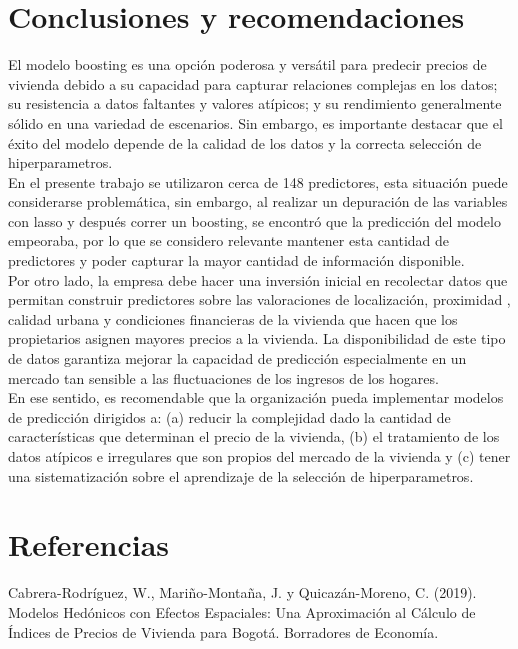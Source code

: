 \documentclass[12pt]{article}
\begin{document}
\section{Conclusiones y recomendaciones}

El modelo  boosting es una opción poderosa y versátil para predecir precios de vivienda debido a su capacidad para capturar relaciones complejas en los datos; su resistencia a datos faltantes y valores atípicos; y su rendimiento generalmente sólido en una variedad de escenarios. Sin embargo, es importante destacar que el éxito del modelo depende de la calidad de los datos y la correcta selección de hiperparametros. \\

En el presente trabajo se utilizaron cerca de 148 predictores, esta situación puede considerarse problemática, sin embargo, al realizar un depuración de las variables con lasso y después correr un boosting, se encontró que la predicción del modelo empeoraba, por lo que se considero relevante mantener esta cantidad de predictores y poder capturar la mayor cantidad de información disponible.\\

Por otro lado, la empresa debe hacer una inversión inicial en recolectar datos que permitan construir predictores sobre las valoraciones de localización, proximidad , calidad urbana y condiciones financieras de la vivienda que hacen que los propietarios asignen mayores precios a la vivienda. La disponibilidad de este tipo de datos garantiza mejorar la capacidad de predicción especialmente en un mercado tan sensible a las fluctuaciones de los ingresos de los hogares. \\

En ese sentido, es recomendable que la organización pueda implementar modelos de predicción dirigidos a: (a) reducir la complejidad dado la cantidad de características que determinan el precio de la vivienda, (b) el tratamiento de los datos atípicos e irregulares que son propios del mercado de la vivienda y (c) tener una sistematización  sobre el aprendizaje de la selección de hiperparametros.\\


\section{Referencias}
Cabrera-Rodríguez, W., Mariño-Montaña, J. y Quicazán-Moreno, C. (2019). Modelos Hedónicos con Efectos Espaciales: Una Aproximación al Cálculo de Índices de Precios de Vivienda para Bogotá. Borradores de Economía.\\
\end{document}
